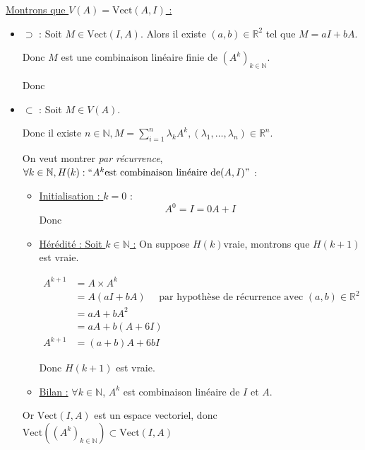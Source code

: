 \documentclass[11pt]{article}
\newcommand{\N}{\mathbb{N}}
\newcommand{\R}{\mathbb{R}}
\newcommand{\vect}{\text{Vect}}
\begin{document}
\begin{enumerate}
		\underline{Montrons que \(V(A) = \text{Vect}(A, I)\) :}
		
		\begin{itemize}
			\renewcommand{\labelitemi}{$\circ$}
			\item \(\boxed{\supset}\) : Soit \(M \in \text{Vect}(I, A)\).
			Alors il existe \((a,b) \in \R^2\) tel que \(M = aI + bA\).
			
			Donc \(M\) est une combinaison linéaire finie de \((A^k)_{k\in\N}\).
			
			Donc \fbox{\(\vect(I,A) \subset \vect((A^k)_{k\in\N})= V(A)\)}
			
			\medskip
			
			\item \(\boxed{\subset}\) : Soit \(M \in V(A)\).
			
			Donc il existe \(n \in \N, M = \sum\limits_{i=1}^{n} \lambda_k A^k, (\lambda_1, \dots, \lambda_n) \in \R^n\).
			
			On veut montrer \textit{par récurrence}, \(\forall k \in \N, H(k) : ``A^k \text{est combinaison linéaire de} (A,I)"\) :
			\begin{itemize}
				\item \underline{Initialisation : \(k = 0\)} :
				\[
					A^0 = I = 0 A + I 
				\]
				Donc 
				\medskip
				\item \underline{Hérédité : Soit \(k \in \N\) :} On suppose \(H(k)\)vraie, montrons que \(H(k+1)\) est vraie.
				
				\begin{align*}
					A^{k+1} &= A \times A^k\\
					&= A (aI + bA) \quad \text{ par hypothèse de récurrence avec } (a,b) \in \R^2\\
					&= aA + bA^2\\
					&= aA + b(A + 6I)\\
					A^{k+1} &= \boxed{(a+b) A + 6bI}
				\end{align*}
			
				Donc \(H(k+1)\) est vraie.
				
				\medskip
				
				\item \underline{Bilan :} \(\forall k \in \N\), \(A^k\) est combinaison linéaire de \(I\) et \(A\).
				
			\end{itemize}
			\medskip
			
			Or \(\vect(I, A)\) est un espace vectoriel, donc \(\vect((A^k)_{k\in\N}) \subset \vect(I, A)\)
			\end{itemize}
		

\end{enumerate}
\end{document}
